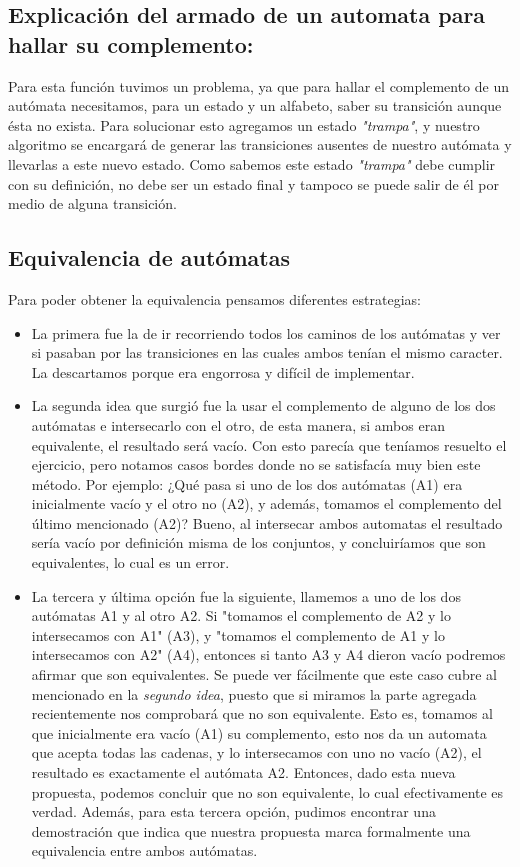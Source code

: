 \subsection{Explicación del armado de un automata para hallar su complemento:}
Para esta función tuvimos un problema, ya que para hallar el complemento de un autómata necesitamos, para un estado y un alfabeto, saber su transición aunque ésta no exista. Para solucionar esto agregamos un estado \textit{"trampa"}, y nuestro algoritmo se encargará de generar las transiciones ausentes de nuestro autómata y llevarlas a este nuevo estado. Como sabemos este estado \textit{"trampa"} debe cumplir con su definición, no debe ser un estado final y tampoco se puede salir de él por medio de alguna transición. 

\subsection{Equivalencia de autómatas}
Para poder obtener la equivalencia pensamos diferentes estrategias:
\begin{itemize}
\item La primera fue la de ir recorriendo todos los caminos de los autómatas y ver si pasaban por las transiciones en las cuales ambos tenían el mismo caracter. La descartamos porque era engorrosa y difícil de implementar.
\item La segunda idea que surgió fue la usar el complemento de alguno de los dos autómatas e intersecarlo con el otro, de esta manera, si ambos eran equivalente, el resultado será vacío. Con esto parecía que teníamos resuelto el ejercicio, pero notamos casos bordes donde no se satisfacía muy bien este método. Por ejemplo: ¿Qué pasa si uno de los dos autómatas (A1) era inicialmente vacío y el otro no (A2), y además, tomamos el complemento del último mencionado (A2)? Bueno, al intersecar ambos automatas el resultado sería vacío por definición misma de los conjuntos, y concluiríamos que son equivalentes, lo cual es un error.
\item La tercera y última opción fue la siguiente, llamemos a uno de los dos autómatas A1 y al otro A2. Si "tomamos el complemento de A2 y lo intersecamos con A1" (A3), y "tomamos el complemento de A1 y lo intersecamos con A2" (A4), entonces si tanto A3 y A4 dieron vacío podremos afirmar que son equivalentes. Se puede ver fácilmente que este caso cubre al mencionado en la \emph{segundo idea}, puesto que si miramos la parte agregada recientemente nos comprobará que no son equivalente. Esto es, tomamos al que inicialmente era vacío (A1) su complemento, esto nos da un automata que acepta todas las cadenas, y lo intersecamos con uno no vacío (A2), el resultado es exactamente el autómata A2. Entonces, dado esta nueva propuesta, podemos concluir que no son equivalente, lo cual efectivamente es verdad. Además, para esta tercera opción, pudimos encontrar una demostración que indica que nuestra propuesta marca formalmente una equivalencia entre ambos autómatas.
\end{itemize}



 



